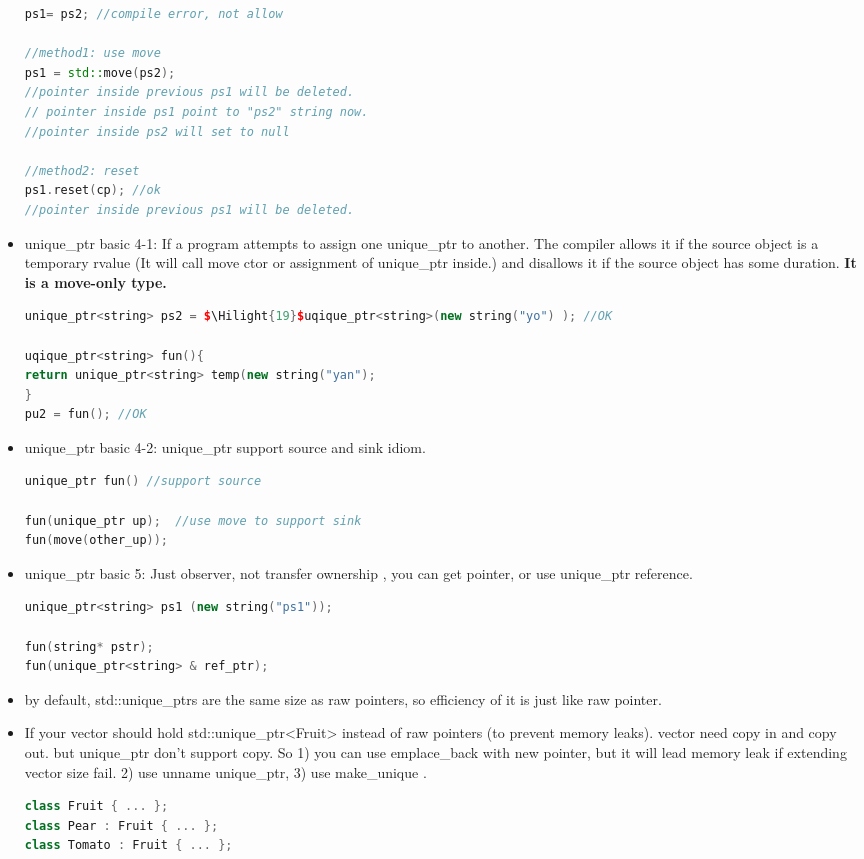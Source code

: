 \documentclass[a4paper,12pt,twoside]{book}
\newcommand{\Hilight}[1]{\makebox[0pt][l]{\color{yellow}\rule[-3pt]{#1em}{11pt}}}
\begin{document}
\begin{itemize}
\begin{lstlisting}[frame=single, language=c++]
ps1= ps2; //compile error, not allow

//method1: use move
ps1 = std::move(ps2);
//pointer inside previous ps1 will be deleted.
// pointer inside ps1 point to "ps2" string now.
//pointer inside ps2 will set to null

//method2: reset
ps1.reset(cp); //ok
//pointer inside previous ps1 will be deleted.
\end{lstlisting}

\item unique\_ptr basic 4-1: If a program attempts to assign one unique\_ptr to another. The compiler allows it if the source object is a temporary rvalue (It will call move ctor or assignment of unique\_ptr inside.) and disallows it if the source object has some duration. \textbf{It is a move-only type.}
\begin{lstlisting}[frame=single, language=c++, mathescape=true]
unique_ptr<string> ps2 = $\Hilight{19}$uqique_ptr<string>(new string("yo") ); //OK

uqique_ptr<string> fun(){
return unique_ptr<string> temp(new string("yan");
}
pu2 = fun(); //OK
\end{lstlisting}

\item unique\_ptr basic 4-2: unique\_ptr support source and sink idiom.
\begin{lstlisting}[frame=single, language=c++]
unique_ptr fun() //support source

fun(unique_ptr up);  //use move to support sink
fun(move(other_up));
\end{lstlisting}

\item unique\_ptr basic 5: Just observer, not transfer ownership , you can get pointer, or use unique\_ptr reference.
\begin{lstlisting}[frame=single, language=c++]
unique_ptr<string> ps1 (new string("ps1"));

fun(string* pstr);
fun(unique_ptr<string> & ref_ptr);
\end{lstlisting}

\item by default, std::unique\_ptrs are the same size as raw pointers, so efficiency of it is just like raw pointer.

\item If your vector should hold std::unique\_ptr<Fruit> instead of raw pointers (to prevent memory leaks).
vector need copy in and copy out. but unique\_ptr don't support copy. So 1) you can use emplace\_back with new pointer, but it will lead memory leak if extending vector size fail. 2) use unname unique\_ptr, 3) use make\_unique .
\begin{lstlisting}[frame=single, language=c++]
class Fruit { ... };
class Pear : Fruit { ... };
class Tomato : Fruit { ... };


\end{lstlisting}
\end{itemize}
\end{document}
